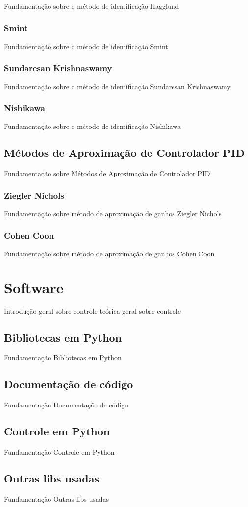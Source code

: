 Fundamentação sobre o método de identificação Hagglund

\subsubsection{Smint}

Fundamentação sobre o método de identificação Smint

\subsubsection{Sundaresan Krishnaswamy}

Fundamentação sobre o método de identificação Sundaresan Krishnaswamy

\subsubsection{Nishikawa}

Fundamentação sobre o método de identificação Nishikawa

\subsection{Métodos de Aproximação de Controlador PID}

Fundamentação sobre Métodos de Aproximação de Controlador PID

\subsubsection{Ziegler Nichols}

Fundamentação sobre método de aproximação de ganhos Ziegler Nichols

\subsubsection{Cohen Coon}

Fundamentação sobre método de aproximação de ganhos Cohen Coon


\section{Software}

Introdução geral sobre controle teórica geral sobre controle

\subsection{Bibliotecas em Python}

Fundamentação Bibliotecas em Python

\subsection{Documentação de código}

Fundamentação Documentação de código

\subsection{Controle em Python}

Fundamentação Controle em Python

\subsection{Outras libs usadas}

Fundamentação Outras libs usadas


